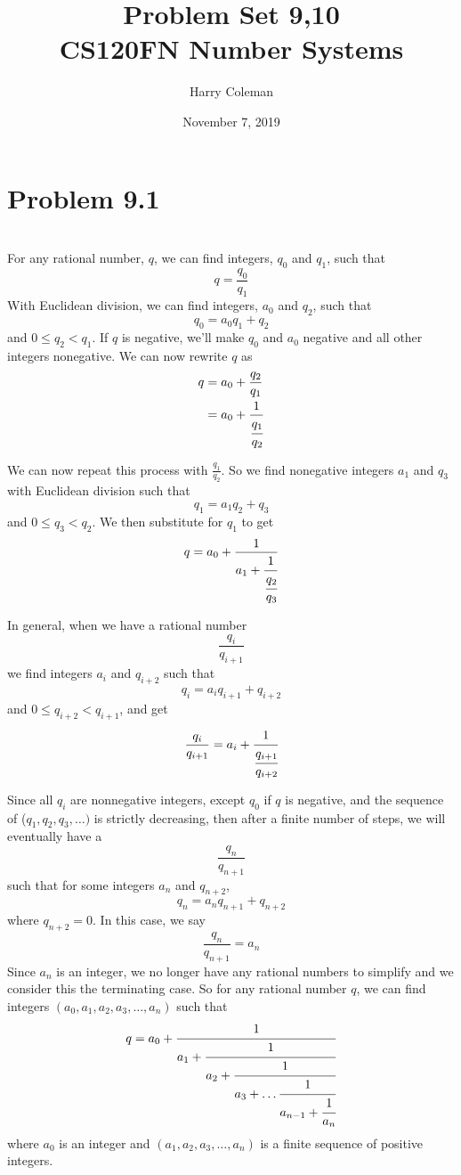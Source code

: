 \documentclass[12pt]{article}
\begin{document}
 
\title{Problem Set 9,10\\
    \large CS120FN Number Systems}
\author{Harry Coleman}
\date{November 7, 2019}

\maketitle

\section*{Problem 9.1}
\\

For any rational number, $q$, we can find integers, $q_0$ and $q_1$, such that
\[q = \frac{q_0}{q_1}\]
With Euclidean division, we can find integers, $a_0$ and $q_2$, such that
\[q_0 = a_0q_1 + q_2\]
and $0 \leq q_2 < q_1$. If $q$ is negative, we'll make $q_0$ and $a_0$ negative and all other integers nonegative. We can now rewrite $q$ as
\begin{align*}
    q  &= a_0 + \frac{q_2}{q_1} \\
       &= a_0 +\frac{1}{\cfrac{q_1}{q_2}}
\end{align*}

We can now repeat this process with $\frac{q_1}{q_2}$. So we find nonegative integers $a_1$ and $q_3$ with Euclidean division such that
\[q_1 = a_1q_2 + q_3\]
and $0 \leq q_3 < q_2$. We then substitute for $q_1$ to get
\[q = a_0 +\frac{1}{a_1 + \cfrac{1}{\cfrac{q_2}{q_3}}}\]

In general, when we have a rational number
\[\frac{q_i}{q_{i+1}}\]
we find integers $a_i$ and $q_{i+2}$ such that
\[q_i = a_iq_{i+1} + q_{i+2}\]
and $0 \leq q_{i+2} < q_{i+1}$, and get
\[\frac{q_i}{q_{i+1}} = a_i + \cfrac{1}{\cfrac{q_{i+1}}{q_{i+2}}}\]

Since all $q_i$ are nonnegative integers, except $q_0$ if $q$ is negative, and the sequence of ($q_1, q_2, q_3,\dots)$ is strictly decreasing, then after a finite number of steps, we will eventually have a
\[\frac{q_n}{q_{n+1}}\]
such that for some integers $a_n$ and $q_{n+2}$,
\[q_n = a_nq_{n+1} + q_{n+2}\]
where $q_{n+2}=0$. In this case, we say
\[\frac{q_n}{q_{n+1}} = a_n\]
Since $a_n$ is an integer, we no longer have any rational numbers to simplify and we consider this the terminating case. So for any rational number $q$, we can find integers $(a_0,a_1,a_2,a_3,\dots,a_n)$ such that
\[q = a_0 +\cfrac{1}{a_1 + \cfrac{1}{a_2 + \cfrac{1}{a_3 + \dots \cfrac{1}{a_{n-1} + \cfrac{1}{a_n}}}}}\]
where $a_0$ is an integer and $(a_1,a_2,a_3,\dots,a_n)$ is a finite sequence of positive integers.
\end{document}
